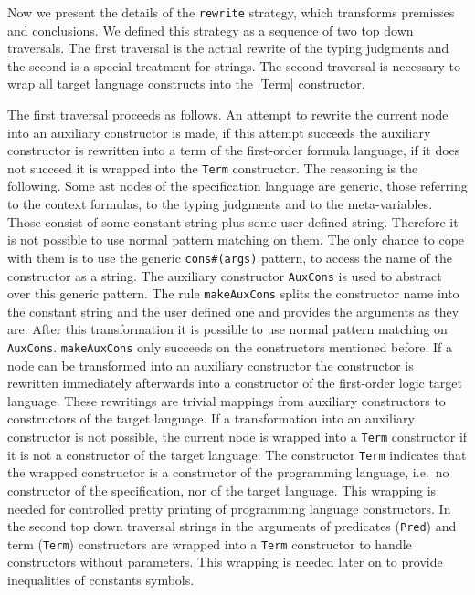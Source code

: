 Now we present the details of the \texttt{rewrite} strategy, which
transforms premisses and conclusions. We defined this strategy as a
sequence of two top down traversals. The first traversal is the actual
rewrite of the typing judgments and the second is a special treatment
for strings. The second traversal is necessary to wrap all target
language constructs into the \ver|Term| constructor.

The first traversal proceeds as follows. An attempt to rewrite the
current node into an auxiliary constructor is made, if this attempt
succeeds the auxiliary constructor is rewritten into a term of the
first-order formula language, if it does not succeed it is wrapped
into the \texttt{Term} constructor. The reasoning is the
following. Some \gls{ast} nodes of the specification language are
generic, those referring to the context formulas, to the typing
judgments and to the meta-variables. Those consist of some constant
string plus some user defined string. Therefore it is not possible to
use normal pattern matching on them. The only chance to cope with them
is to use the generic \texttt{cons\#(args)} pattern, to access the
name of the constructor as a string. The auxiliary constructor
\texttt{AuxCons} is used to abstract over this generic pattern. The
rule \texttt{makeAuxCons} splits the constructor name into the
constant string and the user defined one and provides the arguments as
they are. After this transformation it is possible to use normal
pattern matching on \texttt{AuxCons}. \texttt{makeAuxCons} only
succeeds on the constructors mentioned before. If a node can be
transformed into an auxiliary constructor the constructor is rewritten
immediately afterwards into a constructor of the first-order logic
target language. These rewritings are trivial mappings from auxiliary
constructors to constructors of the target language. If a
transformation into an auxiliary constructor is not possible, the
current node is wrapped into a \texttt{Term} constructor if it is not
a constructor of the target language. The constructor \texttt{Term}
indicates that the wrapped constructor is a constructor of the
programming language, i.e.\ no constructor of the specification, nor
of the target language. This wrapping is needed for controlled pretty
printing of programming language constructors. In the second top down
traversal strings in the arguments of predicates (\texttt{Pred}) and
term (\texttt{Term}) constructors are wrapped into a \texttt{Term}
constructor to handle constructors without parameters. This wrapping
is needed later on to provide inequalities of constants symbols.

